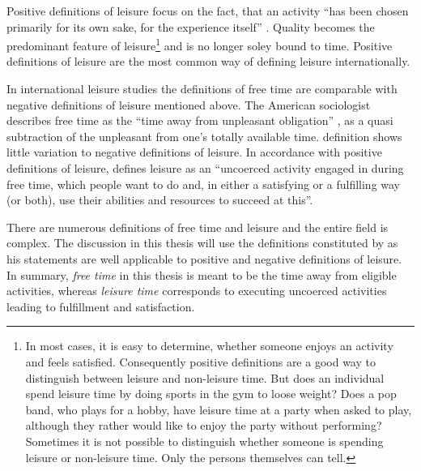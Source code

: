 \documentclass[12pt,numbers=noenddot,parskip,bibliography=totocnumbered,listof=totocnumbered,draft]{scrreprt}
\begin{document}
Positive definitions of leisure focus on the fact, that an activity ``has been chosen primarily for its own sake, for the experience itself'' \citep[p.15]{freysinger2000}. Quality becomes the predominant feature of leisure\footnote{In most cases, it is easy to determine, whether someone enjoys an activity and feels satisfied. Consequently positive definitions are a good way to distinguish between leisure and non-leisure time. But does an individual spend leisure time by doing sports in the gym to loose weight? Does a pop band, who plays for a hobby, have leisure time at a party when asked to play, although they rather would like to enjoy the party without performing? Sometimes it is not possible to distinguish whether someone is spending leisure or non-leisure time. Only the persons themselves can tell.} and is no longer soley bound to time. Positive definitions of leisure are the most common way of defining leisure internationally.

In international leisure studies the definitions of free time are comparable with negative definitions of leisure mentioned above. The American sociologist \citeauthor{stebbins2007} describes free time as the ``time away from unpleasant obligation'' \cite[p.4]{stebbins2007}, as a quasi subtraction of the unpleasant from one's totally available time. \citeauthor{stebbins2007} definition shows little variation to negative definitions of leisure. In accordance with positive definitions of leisure, \citeauthor{stebbins2007} defines leisure as an ``uncoerced  activity engaged in during free time, which people want to do and, in either a satisfying or a fulfilling way (or both), use their abilities and resources to succeed at this''.

There are numerous definitions of free time and leisure and the entire field is complex. The discussion in this thesis will use the definitions constituted by \citeauthor{stebbins2007} as his statements are well applicable to positive and negative definitions of leisure. In summary, \textit{free time} in this thesis is meant to be the time away from eligible activities, whereas \textit{leisure time} corresponds to executing uncoerced activities leading to fulfillment and satisfaction.
\end{document}

